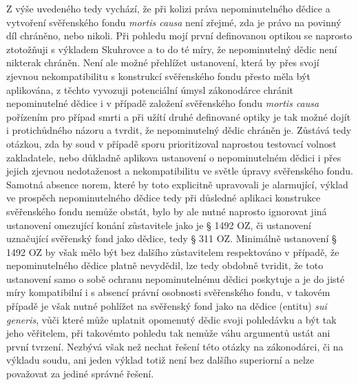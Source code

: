 \documentclass{article}
\begin{document}
Z výše uvedeného tedy vychází, že při kolizi práva nepominutelného dědice a vytvoření svěřenského fondu \textit{mortis causa} není zřejmé, zda je právo na povinný díl chráněno, nebo nikoli. Při pohledu mojí první definovanou optikou se naprosto ztotožňuji s výkladem Skuhrovce a to do té míry, že nepominutelný dědic není nikterak chráněn. Není ale možné přehlížet ustanovení, která by přes svojí zjevnou nekompatibilitu s konstrukcí svěřenského fondu přesto měla být aplikována, z těchto vyvozuji potenciální úmysl zákonodárce chránit nepominutelné dědice i v případě založení svěřenského fondu \textit{mortis causa} pořízením pro případ smrti a při užítí druhé definované optiky je tak možné dojít i protichůdného názoru a tvrdit, že nepominutelný dědic chráněn je. Zůstává tedy otázkou, zda by soud v případě sporu prioritizoval naprostou testovací volnost zakladatele, nebo důkladně aplikova ustanovení o nepominutelném dědici i přes jejich zjevnou nedotaženost a nekompatibilitu ve světle úpravy svěřenského fondu. Samotná absence norem, které by toto explicitně upravovali je alarmující, výklad ve prospěch nepominutelného dědice tedy při důsledné aplikaci konstrukce svěřenského fondu nemůže obstát, bylo by ale nutné naprosto ignorovat jiná ustanovení omezující konání zůstavitele jako je § 1492 OZ, či ustanovení uznačující svěřenský fond jako dědice, tedy § 311 OZ. Minimálně ustanovení § 1492 OZ by však mělo být bez dalšího zůstavitelem respektováno v případě, že nepominutelného dědice platně nevydědil, lze tedy obdobně tvridit, že toto ustanovení samo o sobě ochranu nepominutelnému dědici poskytuje a je do jisté míry kompatibilní i s absencí právní osobnosti svěřenského fondu, v takovém případě je však nutné pohlížet na svěřenský fond jako na dědice (entitu) \textit{sui generis}, vůči které může uplatnit opomenutý dědic svoji pohledávku a být tak jeho věřitelem, při takovémto pohledu tak nemůže váhu argumentů ustát ani první tvrzení. Nezbývá však než nechat řešení této otázky na zákonodárci, či na výkladu soudu, ani jeden výklad totiž není bez dalšího superiorní a nelze považovat za jediné správné řešení.\\
\end{document}
